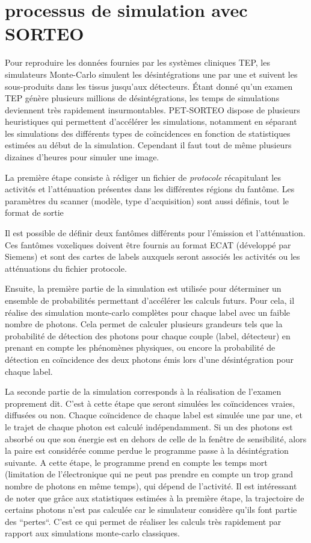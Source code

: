 	\section{processus de simulation avec SORTEO}

Pour reproduire les données fournies par les systèmes cliniques TEP, les simulateurs Monte-Carlo simulent les désintégrations une par une et suivent les sous-produits dans les tissus jusqu'aux détecteurs. Étant donné qu'un examen TEP génère plusieurs millions de désintégrations, les temps de simulations deviennent très rapidement insurmontables. PET-SORTEO dispose de plusieurs heuristiques qui permettent d'accélérer les simulations, notamment en séparant les simulations des différents types de coïncidences en fonction de statistiques estimées au début de la simulation. Cependant il faut tout de même plusieurs dizaines d'heures pour simuler une image.

La première étape consiste à rédiger un fichier de \emph{protocole} récapitulant les activités et l'atténuation présentes dans les différentes régions du fantôme. Les paramètres du scanner (modèle, type d'acquisition) sont aussi définis, tout le format de sortie

Il est possible de définir deux fantômes différents pour l'émission et l'atténuation. Ces fantômes voxeliques doivent être fournis au format ECAT (développé par Siemens) et sont des cartes de labels auxquels seront associés les activités ou les atténuations du fichier protocole.

Ensuite, la première partie de la simulation est utilisée pour déterminer un ensemble de probabilités permettant d'accélérer les calculs futurs. Pour cela, il réalise des simulation monte-carlo complètes pour chaque label avec un faible nombre de photons. Cela permet de calculer plusieurs grandeurs tels que la probabilité de détection des photons pour chaque couple (label, détecteur) en prenant en compte les phénomènes physiques, ou encore la probabilité de détection en coïncidence des deux photons émis lors d'une désintégration pour chaque label.

La seconde partie de la simulation corresponds à la réalisation de l'examen proprement dit. C'est à cette étape que seront simulées les coïncidences vraies, diffusées ou non. Chaque coïncidence de chaque label est simulée une par une, et le trajet de chaque photon est calculé indépendamment. Si un des photons est absorbé ou que son énergie est en dehors de celle de la fenêtre de sensibilité, alors la paire est considérée comme perdue le programme passe à la désintégration suivante. A cette étape, le programme prend en compte les temps mort (limitation de l'électronique qui ne peut pas prendre en compte un trop grand nombre de photons en même temps), qui dépend de l'activité. Il est intéressant de noter que grâce aux statistiques estimées à la première étape, la trajectoire de certains photons n'est pas calculée car le simulateur considère qu'ils font partie des ``pertes``. C'est ce qui permet de réaliser les calculs très rapidement par rapport aux simulations monte-carlo classiques.

